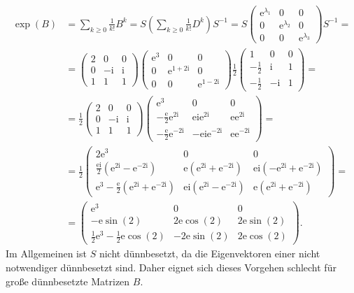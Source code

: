 \documentclass[english, parskip=full]{scrartcl}
\newcommand{\kla}{}
\renewcommand{\i}{\text{i}}
\newcommand{\e}{\text{e}}
\begin{document}
\begin{align}
\exp(B) &= \sum_{k\ge 0} \frac{1}{k!}B^k = S \kla\left( \sum_{k\ge 0} \frac{1}{k!}D^k \right) S^{-1} = S \begin{pmatrix}
\e^{\lambda_1} & 0 & 0 \\
0 & \e^{\lambda_2} & 0 \\
0 & 0 & \e^{\lambda_3}
\end{pmatrix} S^{-1} = \\
&= \begin{pmatrix}
2 & 0 & 0 \\ 0 & -\i & \i \\ 1 & 1 & 1
\end{pmatrix}\begin{pmatrix}
\e^3 & 0 & 0 \\ 0 & \e^{1+2\i} & 0 \\ 0 & 0 & \e^{1-2\i}
\end{pmatrix} \frac{1}{2} \begin{pmatrix}
1 & 0 & 0 \\ -\frac{1}{2} & \i & 1 \\ -\frac{1}{2} & -\i & 1
\end{pmatrix} = \\
&= \frac{1}{2} \begin{pmatrix}
2 & 0 & 0 \\ 0 & -\i & \i \\ 1 & 1 & 1
\end{pmatrix} \begin{pmatrix}
\e^3 & 0 & 0 \\ 
-\frac{\e}{2} \e^{2\i} & \e\i\e^{2\i} & \e\e^{2\i} \\
-\frac{\e}{2} \e^{-2\i} & -\e\i\e^{-2\i} & \e\e^{-2\i}
\end{pmatrix} = \\
&= \frac{1}{2} \begin{pmatrix}
2\e^3 & 0 & 0 \\
\frac{\e\i}{2}\kla\left( \e^{2\i} - \e^{-2\i} \right) & \e\kla\left( \e^{2\i} + \e^{-2\i} \right) & \e\i\kla\left( -\e^{2\i} + \e^{-2\i} \right) \\
\e^3 - \frac{\e}{2}\kla\left( \e^{2\i} + \e^{-2\i} \right) & \e\i \kla\left( \e^{2\i} - \e^{-2\i} \right) & \e\kla\left( \e^{2\i} + \e^{-2\i} \right)
\end{pmatrix} = \\
&= \begin{pmatrix}
\e^3 & 0 & 0 \\
-\e\sin(2) & 2\e\cos(2) & 2\e\sin(2) \\
\frac{1}{2}\e^3 - \frac{1}{2}\e\cos(2) & -2\e\sin(2) & 2\e\cos(2)
\end{pmatrix}.
\end{align}
Im Allgemeinen ist $S$ nicht dünnbesetzt, da die Eigenvektoren einer nicht notwendiger dünnbesetzt sind.
Daher eignet sich dieses Vorgehen schlecht für große dünnbesetzte Matrizen $B$.
\end{document}
